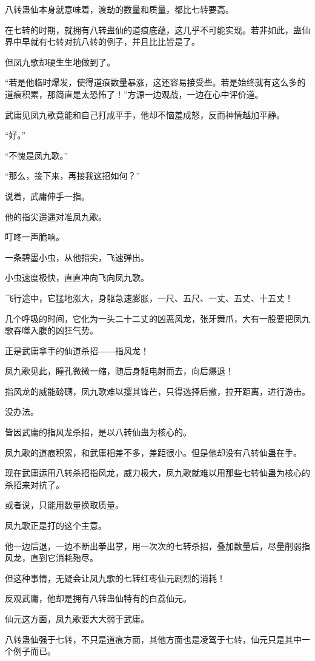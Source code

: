 \begin{this_body}
八转蛊仙本身就意味着，渡劫的数量和质量，都比七转要高。

在七转的时期，就拥有八转蛊仙的道痕底蕴，这几乎不可能实现。若非如此，蛊仙界中早就有七转对抗八转的例子，并且比比皆是了。

但凤九歌却硬生生地做到了。

“若是他临时爆发，使得道痕数量暴涨，这还容易接受些。若是始终就有这么多的道痕积累，那简直是太恐怖了！”方源一边观战，一边在心中评价道。

武庸见凤九歌竟能和自己打成平手，他却不恼羞成怒，反而神情越加平静。

“好。”

“不愧是凤九歌。”

“那么，接下来，再接我这招如何？”

说着，武庸伸手一指。

他的指尖遥遥对准凤九歌。

叮咚一声脆响。

一条碧墨小虫，从他指尖，飞速弹出。

小虫速度极快，直直冲向飞向凤九歌。

飞行途中，它猛地涨大，身躯急速膨胀，一尺、五尺、一丈、五丈、十五丈！

几个呼吸的时间，它化为一头二十二丈的凶恶风龙，张牙舞爪，大有一股要把凤九歌吞噬入腹的凶狂气势。

正是武庸拿手的仙道杀招――指风龙！

凤九歌见此，瞳孔微微一缩，随后身躯电射而去，向后爆退！

指风龙的威能磅礴，凤九歌难以撄其锋芒，只得选择后撤，拉开距离，进行游击。

没办法。

皆因武庸的指风龙杀招，是以八转仙蛊为核心的。

凤九歌的道痕积累，和武庸相差不多，差距很小。但是他却没有八转仙蛊在手。

现在武庸运用八转杀招指风龙，威力极大，凤九歌就难以用那些七转仙蛊为核心的杀招来对抗了。

或者说，只能用数量换取质量。

凤九歌正是打的这个主意。

他一边后退，一边不断出拳出掌，用一次次的七转杀招，叠加数量后，尽量削弱指风龙，直到它消耗殆尽。

但这种事情，无疑会让凤九歌的七转红枣仙元剧烈的消耗！

反观武庸，他却是拥有八转蛊仙特有的白荔仙元。

仙元这方面，凤九歌要大大弱于武庸。

八转蛊仙强于七转，不只是道痕方面，其他方面也是凌驾于七转，仙元只是其中一个例子而已。


\end{this_body}
